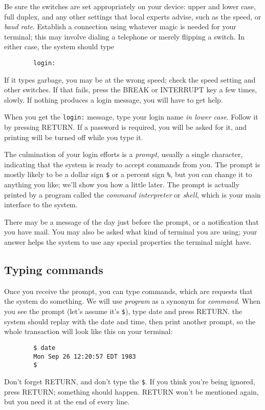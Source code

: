 Be sure the switches are set appropriately on your device: upper and lower case,
full duplex, and any other settings that local experts advise, such as the
speed, or \textit{baud rate}. Establish a connection using whatever magic is
needed for your terminal; this may involve dialing a telephone or merely
flipping a switch. In either case, the system should type
\begin{verbatim}
        login:
\end{verbatim}
If it types garbage, you may be at the wrong speed; check the speed setting and
other switches. If that fails, press the BREAK or INTERRUPT key a few times,
slowly. If nothing produces a login message, you will have to get help.

When you get the \verb=login:= message, type your login name \textit{in lower
  case}. Follow it by pressing RETURN. If a password is required, you will be
asked for it, and printing will be turned off while you type it.

The culmination of your login efforts is a \textit{prompt}, usually a single
character, indicating that the system is ready to accept commands from you. The
prompt is mostly likely to be a dollar sign \verb=$= or a percent sign \verb=%=,
but you can change it to anything you like; we'll show you how a little
later. The prompt is actually printed by a program called the \textit{command
  interpreter} or \textit{shell}, which is your main interface to the system.

There may be a message of the day just before the prompt, or a notification that
you have mail. You may also be asked what kind of terminal you are using; your
answer helps the system to use any special properties the terminal might have.


\subsection{Typing commands}

Once you receive the prompt, you can type commands, which are requests that the
system do something. We will use \textit{program} as a synonym for
\textit{command}. When you see the prompt (let's assume it's \verb=$=), type
date and press RETURN. the system should replay with the date and time, then
print another prompt, so the whole transaction will look like this on your
terminal:
\begin{verbatim}
        $ date
        Mon Sep 26 12:20:57 EDT 1983
        $
\end{verbatim}
Don't forget RETURN, and don't type the \verb=$=. If you think you're being
ignored, press RETURN; something should happen. RETURN won't be mentioned again,
but you need it at the end of every line.

